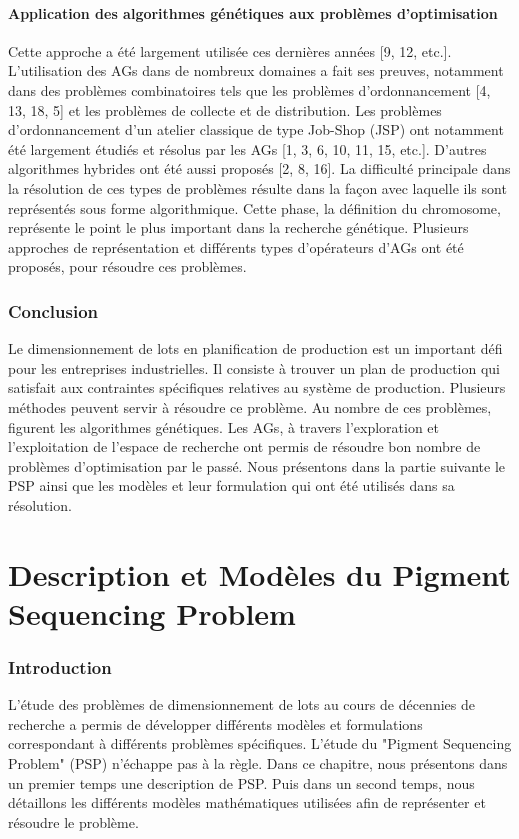 \documentclass[12pt,a4paper]{article}
\begin{document}
	\subsection{Application des algorithmes génétiques aux problèmes d'optimisation}
	
	Cette approche a été largement utilisée ces dernières années [9, 12, etc.]. L’utilisation des AGs dans de nombreux domaines a fait ses preuves, notamment dans des problèmes combinatoires tels que les problèmes d’ordonnancement [4, 13, 18, 5] et les problèmes de collecte et de distribution. Les problèmes d’ordonnancement d’un atelier classique de type Job-Shop (JSP) ont notamment été largement étudiés et résolus par les AGs [1, 3, 6, 10, 11, 15, etc.]. D’autres algorithmes hybrides ont été aussi proposés [2, 8, 16]. La difficulté principale dans la résolution de ces types de problèmes résulte dans la façon avec laquelle ils sont représentés sous forme algorithmique. Cette phase, la définition du chromosome, représente le point le plus important dans la recherche génétique. Plusieurs approches de représentation
et différents types d’opérateurs d’AGs ont été proposés, pour résoudre ces problèmes.
	
	\section*{Conclusion}
	Le dimensionnement de lots en planification de production est un important défi pour les entreprises industrielles. Il consiste à trouver un plan de production qui satisfait aux contraintes spécifiques relatives au système de production. Plusieurs méthodes peuvent servir à résoudre ce problème. Au nombre de ces problèmes, figurent les algorithmes génétiques. Les AGs, à travers l'exploration et l'exploitation de l'espace de recherche ont permis de résoudre bon nombre de problèmes d'optimisation par le passé. Nous présentons dans la partie suivante le PSP ainsi que les modèles et leur formulation qui ont été utilisés dans sa résolution.
		
	\newpage
	
	\part{Description et Modèles du Pigment Sequencing Problem}
	\label{part:psp}
	
	\setcounter{section}{0}
	
		\section*{Introduction}
		L'étude des problèmes de dimensionnement de lots au cours de décennies de recherche a permis de développer différents modèles et formulations correspondant à différents problèmes spécifiques. L'étude du "Pigment Sequencing Problem" (PSP) n'échappe pas à la règle. Dans ce chapitre, nous présentons dans un premier temps une description de PSP. Puis dans un second temps, nous détaillons les différents modèles mathématiques utilisées afin de représenter et résoudre le problème.
		
\end{document}

